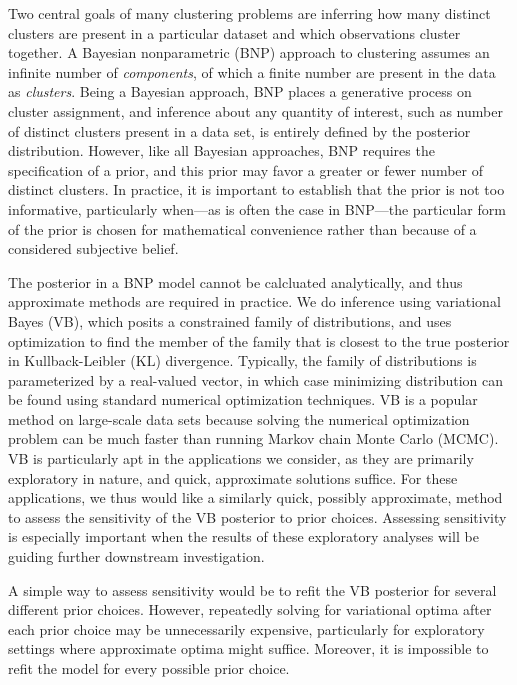 Two central goals of many clustering problems are inferring how many distinct
clusters are present in a particular dataset and which observations cluster together.
A Bayesian nonparametric (BNP) approach to clustering assumes an infinite
number of \textit{components},
of which a finite number are present in the data as \textit{clusters}.
Being a Bayesian approach, BNP places a generative process
on cluster assignment,
and inference about any quantity of interest,
such as number of distinct clusters present in a data set,
is entirely defined by the posterior distribution.
However, like all Bayesian approaches, BNP requires the specification
of a prior, and this prior may favor a greater or fewer number of distinct clusters.
In practice, it is important to establish that the prior is not too informative, particularly
when---as is often the case in BNP---the particular form of the prior is chosen for
mathematical convenience rather than because of a considered subjective belief.

The posterior in a BNP model cannot be calcluated analytically,
and thus approximate methods are required in practice.
We do inference using variational Bayes (VB), which posits a constrained
family of distributions, and uses optimization to find
the member of the family that is closest to the true posterior in
Kullback-Leibler ($\mathrm{KL}$) divergence.
Typically, the family of distributions is parameterized by a real-valued vector,
in which case minimizing distribution can be found using
standard numerical optimization techniques.
VB is a popular method on large-scale data sets
because solving the numerical optimization problem can be much faster than
running Markov chain Monte Carlo (MCMC).
VB is particularly apt in the applications we consider,
as they are primarily exploratory in nature, and quick, approximate solutions
suffice.
For these applications, we thus would like a similarly quick, possibly approximate,
method to assess
the sensitivity of the VB posterior to prior choices.
Assessing sensitivity is especially important
when the results of these exploratory analyses will be guiding further
downstream investigation.

A simple way to assess sensitivity would be to refit the VB posterior for
several different prior choices.
However, repeatedly solving for variational optima after each prior choice
may be unnecessarily expensive, particularly for exploratory settings where
approximate optima might suffice.
Moreover, it is impossible to refit the model for every possible prior
choice. 




